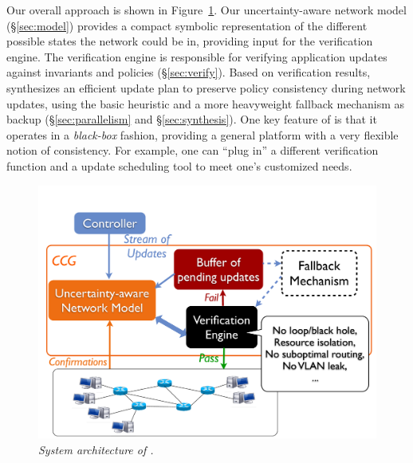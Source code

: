 Our overall approach is shown in Figure~\ref{fig:structure}.
Our uncertainty-aware network model (\S\ref{sec:model}) provides a compact symbolic
representation of the different possible states the network could be in,
providing input for the verification engine.
The verification engine is responsible for verifying 
application updates against 
invariants and policies (\S\ref{sec:verify}). 
Based on verification results, \name synthesizes an
efficient update plan to preserve policy consistency during network updates,
using the basic heuristic and a more heavyweight fallback mechanism as backup 
(\S\ref{sec:parallelism} and \S\ref{sec:synthesis}).  
One key feature of \name is that it operates in a {\em black-box} fashion, providing
a general platform with a very flexible notion of consistency.
For example, one can 
``plug in'' a different verification
function and a  update scheduling tool to meet one's customized needs.

\begin{figure}[!ht]
  \centering
  \includegraphics[scale=0.2,trim=0 0 0 1cm]{figs/structure_new}
  \vspace{-0.1in}
  \caption{\em \small System architecture of \name.}
  \vspace{-0.2in}
  \label{fig:structure}
\end{figure}

